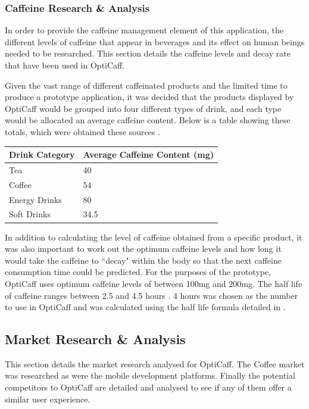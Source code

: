 \subsubsection{Caffeine Research \& Analysis} 
\label{sec:Caffeine}
In order to provide the caffeine management element of this application, the different levels of caffeine that appear in beverages and its effect on human beings needed to be researched.
This section details the caffeine levels and decay rate that have been used in OptiCaff. 

Given the vast range of different caffeinated products and the limited time to produce a prototype application, it was decided that the products displayed by OptiCaff would be grouped into four different types of drink, and each type would be allocated an average caffeine content. Below is a table showing these totals, which were obtained these sources \cite{Coke} \cite{TeaCoffee} \cite{EnergyDrink}.

\begin{center}
\begin{tabular}{|l|l|}
\hline
\textbf{Drink Category} & \textbf{Average Caffeine Content (mg)} \\\hline
Tea & 40 \\\hline
Coffee & 54 \\\hline
Energy Drinks & 80 \\\hline
Soft Drinks & 34.5 \\\hline
\end{tabular}
\end{center}

In addition to calculating the level of caffeine obtained from a specific product, it was also important to work out the optimum caffeine levels and how long it would take the caffeine to ``decay" within the body so that the next caffeine consumption time could be predicted. 
For the purposes of the prototype, OptiCaff uses optimum caffeine levels of between 100mg and 200mg. 
The half life of caffeine ranges between 2.5 and 4.5 hours \cite{CaffeinePharmacology} \cite{CaffeinePharmacy}. 
4 hours was chosen as the number to use in OptiCaff and was calculated using the half life formula detailed in \cite{HalfLife}.
 
\subsection{Market Research \& Analysis}
This section details the market research analysed for OptiCaff.
The Coffee market was researched as were the mobile development platforms. 
Finally the potential competitors to OptiCaff are detailed and analysed to see if any of them offer a similar user experience. 

